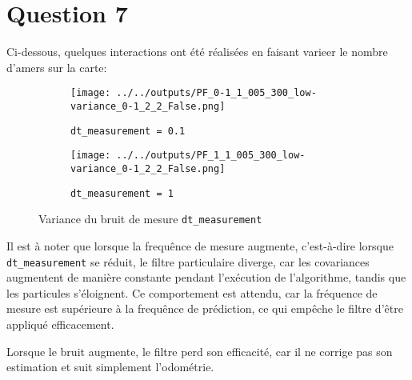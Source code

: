 \documentclass[../CSC_5RO12_TA_TP3.tex]{subfiles}
\begin{document}
\section{Question 7}
\noindent Ci-dessous, quelques interactions ont été réalisées en faisant varieer le nombre d'amers sur la carte:
\begin{figure}[H]
    \centering
    \begin{subfigure}[b]{0.475\textwidth}
        \centering
        \texttt{[image: ../../outputs/PF\_0-1\_1\_005\_300\_low-variance\_0-1\_2\_2\_False.png]}
        \caption{\texttt{dt\_measurement = 0.1}}
        \label{}
    \end{subfigure}\hfill
    \begin{subfigure}[b]{0.475\textwidth}
        \centering
        \texttt{[image: ../../outputs/PF\_1\_1\_005\_300\_low-variance\_0-1\_2\_2\_False.png]}
        \caption{\texttt{dt\_measurement = 1}}
        \label{}
    \end{subfigure}
    \caption{Variance du bruit de mesure \texttt{dt\_measurement}}
    \label{}
\end{figure}
\noindent Il est à noter que lorsque la frequênce de mesure augmente, c'est-à-dire lorsque \texttt{dt\_measurement} se réduit, le filtre particulaire diverge, car les covariances augmentent de manière constante pendant l'exécution de l'algorithme, tandis que les particules s'éloignent. Ce comportement est attendu, car la fréquence de mesure est supérieure à la frequênce de prédiction, ce qui empêche le filtre d'être appliqué efficacement.

\begin{remark}
    Lorsque le bruit augmente, le filtre perd son efficacité, car il ne corrige pas son estimation et suit simplement l'odométrie.
\end{remark}
\end{document}
